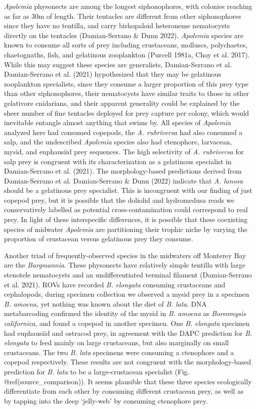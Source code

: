 \documentclass[12pt,]{article}
\begin{document}
\emph{Apolemia} physonects are among the longest siphonophores, with colonies reaching as far as 30m of length. Their tentacles are different from other siphonophores since they have no tentilla, and carry birhopaloid heteroneme nematocysts directly on the tentacles (Damian-Serrano \& Dunn 2022). \emph{Apolemia} species are known to consume all sorts of prey including crustaceans, molluscs, polychaetes, chaetognaths, fish, and gelatinous zooplankton (Purcell 1981a, Choy et al. 2017). While this may suggest these species are generalists, Damian-Serrano et al. Damian-Serrano et al. (2021) hypothesized that they may be gelatinous zooplankton specialists, since they consume a larger proportion of this prey type than other siphonophores, their nematocysts have similar traits to those in other gelativore cnidarians, and their apparent generality could be explained by the sheer number of fine tentacles deployed for prey capture per colony, which would inevitable entangle almost anything that swims by. All species of \emph{Apolemia} analyzed here had consumed copepods, the \emph{A. rubriversa} had also consumed a salp, and the undescribed \emph{Apolemia} species also had ctenophore, larvacean, mysid, and euphausiid prey sequences. The high selectivity of \emph{A. rubriversa} for salp prey is congruent with its characterization as a gelatinous specialist in Damian-Serrano et al. (2021). The morphology-based predictions derived from Damian-Serrano et al. Damian-Serrano \& Dunn (2022) indicate that \emph{A. lanosa} should be a gelatinous prey specialist. This is incongruent with our finding of just copepod prey, but it is possible that the doliolid and hydromedusa reads we conservatively labelled as potential cross-contamination could correspond to real prey. In light of these interspecific differences, it is possible that these coexisting species of midwater \emph{Apolemia} are partitioning their trophic niche by varying the proportion of crustacean versus gelatinous prey they consume.

Another triad of frequently-observed species in the midwaters off Monterey Bay are the \emph{Bargmannia}. These physonects have relatively simple tentilla with large stenotele nematocysts and an undifferentiated terminal filament (Damian-Serrano et al. 2021). ROVs have recorded \emph{B. elongata} consuming crustaceans and cephalopods, during specimen collection we observed a mysid prey in a specimen \emph{B. amoena}, yet nothing was known about the diet of \emph{B. lata}. DNA metabarcoding confirmed the identity of the mysid in \emph{B. amoena} as \emph{Boreomysis californica}, and found a copepod in another specimen. One \emph{B. elongata} specimen had euphausiid and ostracod prey, in agreement with the DAPC prediction for \emph{B. elongata} to feed mainly on large crustaceans, but also marginally on small crustaceans. The two \emph{B. lata} specimens were consuming a ctenophore and a copepod respectively. These results are not congruent with the morphology-based prediction for \emph{B. lata} to be a large-crustacean specialist (Fig. @ref(source\_comparison)). It seems plausible that these three species ecologically differentiate from each other by consuming different crustacean prey, as well as by tapping into the deep `jelly-web' by consuming ctenophore prey.
\end{document}
